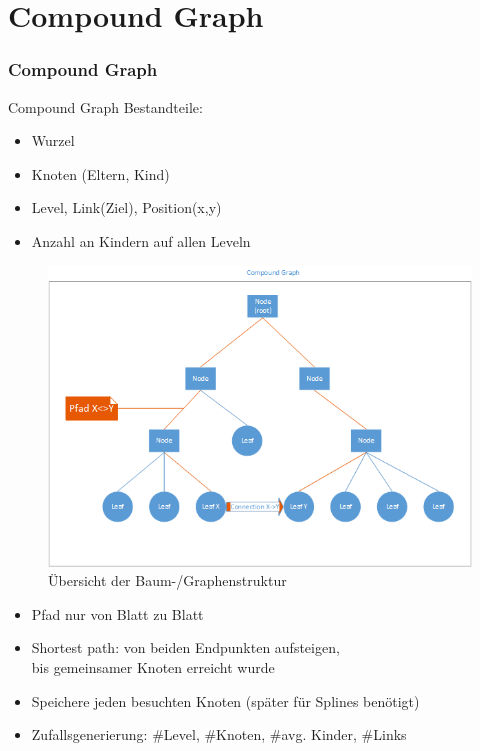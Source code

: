 \documentclass[11pt]{beamer}
\begin{document}
\section{Compound Graph}
\begin{frame}[allowframebreaks]
\frametitle{Compound Graph}

Compound Graph Bestandteile:
\begin{itemize} 
\item Wurzel
\item Knoten (Eltern, Kind)                                                                                                                       
\item Level, Link(Ziel), Position(x,y)
\item Anzahl an Kindern auf allen Leveln
\end{itemize}

\begin{figure}
\centering
\includegraphics[width=0.79\linewidth]{./Compound_overview}
\caption[Compound_overview]{Übersicht der Baum-/Graphenstruktur}
\label{fig:Compound_overview}
\end{figure}


\framebreak
\begin{itemize} 
\item Pfad nur von Blatt zu Blatt
\item Shortest path: von beiden Endpunkten aufsteigen, \\ bis gemeinsamer Knoten erreicht wurde
\item Speichere jeden besuchten Knoten (später für Splines benötigt)
\item Zufallsgenerierung: \#Level, \#Knoten, \#avg. Kinder, \#Links
\end{itemize}



\end{frame}
\end{document}
